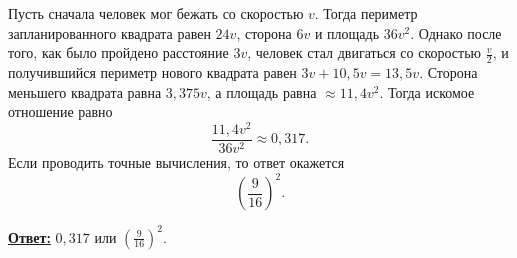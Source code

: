		Пусть сначала человек мог бежать со скоростью $v$. Тогда периметр запланированного квадрата равен $24v$, сторона $6v$ и площадь $36v^2$. Однако после того, как было пройдено расстояние $3v$, человек стал двигаться со скоростью $\frac{v}{2}$, и получившийся периметр нового квадрата равен $3v + 10{,}5v = 13{,}5v$. Сторона меньшего квадрата равна $3,375v$, а площадь равна $\approx 11{,}4v^2$. Тогда искомое отношение равно
\[
	\frac{11{,}4v^2}{36v^2} \approx 0{,}317.
\]
Если проводить точные вычисления, то ответ окажется 
\[
	\left( \frac{9}{16} \right)^2.
\]

\underline{\textbf{Ответ:}} $0{,}317$ или $\left( \frac{9}{16} \right)^2$.